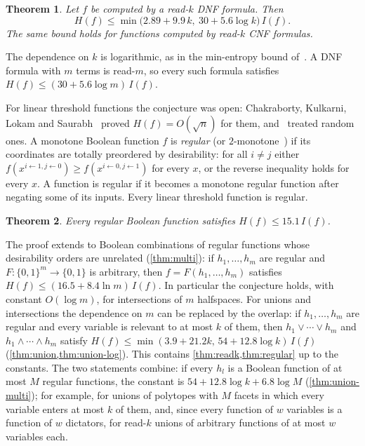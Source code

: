 \documentclass[11pt]{amsart}
\newtheorem{theorem}{Theorem}[section]
\theoremstyle{definition}
\theoremstyle{remark}
\newcommand{\bits}{\{0,1\}}
\begin{document}
\begin{theorem}\label{thm:readk}
Let $f$ be computed by a read-$k$ DNF formula. Then
\[
H(f)\le \min\bigl(2.89+9.9\,k,\ 30+5.6\log k\bigr)\,I(f).
\]
The same bound holds for functions computed by read-$k$ CNF formulas.
\end{theorem}

The dependence on $k$ is logarithmic, as in the min-entropy bound of~\cite{ACKSW21}. A DNF formula with $m$ terms is
read-$m$, so every such formula satisfies $H(f)\le(30+5.6\log m)\,I(f)$.

For linear threshold functions the conjecture was open: Chakraborty, Kulkarni, Lokam and Saurabh~\cite{CKLS16} proved
$H(f)=O(\sqrt n)$ for them, and~\cite{CKKLS18} treated random ones. A monotone Boolean function $f$ is
\emph{regular} (or $2$-monotone~\cite{Mur71}) if its coordinates are totally
preordered by desirability: for all $i\ne j$ either $f(x^{i\leftarrow1,j\leftarrow0})\ge f(x^{i\leftarrow0,j\leftarrow1})$
for every $x$, or the reverse inequality holds for every $x$. A function is regular if it becomes a monotone
regular function after negating some of its inputs. Every linear threshold function is regular.

\begin{theorem}\label{thm:regular}
Every regular Boolean function satisfies $H(f)\le 15.1\,I(f)$.
\end{theorem}

The proof extends to Boolean combinations of regular functions whose desirability orders are unrelated
(\cref{thm:multi}): if $h_1,\dots,h_m$ are regular and $F:\bits^m\to\bits$ is arbitrary, then
$f=F(h_1,\dots,h_m)$ satisfies $H(f)\le(16.5+8.4\ln m)\,I(f)$. In particular the conjecture holds, with constant
$O(\log m)$, for intersections of $m$ halfspaces. For unions and intersections the dependence on $m$ can be replaced
by the overlap: if $h_1,\dots,h_m$ are regular and every variable is relevant to at most $k$ of them, then
$h_1\vee\cdots\vee h_m$ and $h_1\wedge\cdots\wedge h_m$ satisfy $H(f)\le\min(3.9+21.2k,\,54+12.8\log k)\,I(f)$
(\cref{thm:union,thm:union-log}). This
contains \cref{thm:readk,thm:regular} up to the constants. The two statements combine: if every $h_l$ is a
Boolean function of at most $M$ regular functions, the constant is $54+12.8\log k+6.8\log M$ (\cref{thm:union-multi});
for example, for unions of polytopes with $M$ facets in which every variable enters at most $k$ of them, and, since
every function of $w$ variables is a function of $w$ dictators, for read-$k$ unions of arbitrary functions of at most
$w$ variables each.
\end{document}
